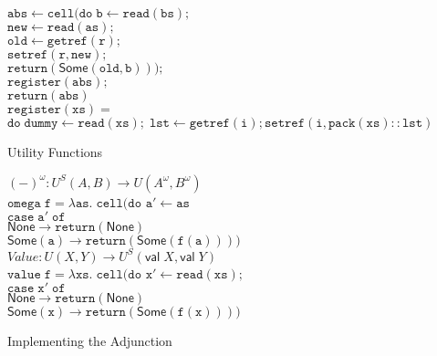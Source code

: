 \documentclass[nocopyrightspace,preprint]{sigplanconf}
\newcommand{\term}[1]{\ensuremath{\mathtt{{#1}}}}
\newcommand{\valtype}[1]{\mathsf{val}\;{#1}}
\newcommand{\None}{\mathsf{None}}
\newcommand{\Some}[1]{\mathsf{Some}({#1})}
\begin{document}
\begin{figure}
{\begin{tabbing}
\>           \>    \>               \>\term{abs \leftarrow cell(do\;}\=\term{b \leftarrow read(bs);} \\
\>           \>    \>               \>                               \>\term{new \leftarrow read(as);} \\
\>           \>    \>               \>                               \>\term{old \leftarrow getref(r);}\\
\>           \>    \>               \>                               \>\term{setref(r, new);}\\
\>           \>    \>               \>                               \>\term{return(\Some{old,b}));}\\
\>           \>    \>               \>\term{register(abs);} \\
\>           \>    \>               \>\term{return(abs)} 
\\[0.5em]

\term{register(xs) = } \\
\;\;\term{do\;dummy \leftarrow read(xs);\; lst \leftarrow getref(i); setref(i, pack(xs) :: lst)} 
\end{tabbing}
}
\caption{Utility Functions}
\label{cokleisli-util}
\end{figure}




\begin{figure}
{\small
\begin{tabbing}
$(-)^\omega : U^S(A,B) \to U(A^\omega, B^\omega)$ \\
\term{omega\;f = \lambda as.\;cell(do} \=\term{a' \leftarrow as}  \\
                                       \>\term{case\;a'\;of} \\
                                   \>\;\;\=\term{\None \to return(\None)} \\
                                   \>    \>\term{\Some{a}\to return(\Some{f(a)}))}
\\[0.5em]

$\mathit{Value} : U(X,Y) \to U^S(\valtype{X}, \valtype{Y})$ \\[0.2em]
\term{value\;f = \lambda xs.\;cell(do} \=\term{x' \leftarrow read(xs);}\\
                                       \>\term{case\;x'\;of}\\
                                       \>\;\;\=\term{\None \to return(\None)} \\
                                       \>\>    \term{\Some{x} \to return(\Some{f(x)}))}

  
\end{tabbing}
}
\caption{Implementing the Adjunction}
\label{adjoint-implementation}  
\end{figure}
\end{document}
